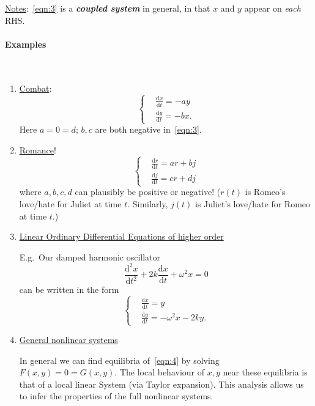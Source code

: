 \documentclass[12pt]{report}
\theoremstyle{definition}
\begin{document}
\noindent \underline{Notes}:~\eqref{eqn:3} is a \textbf{\emph{coupled system}} in general,
in that $x$ and $y$ appear on \emph{each} RHS.\@

\paragraph{Examples}
\,

\begin{enumerate}[label = (\alph*)]
    \item \underline{Combat}:\[
        \left\{\begin{align*}
            & \frac{\mathrm{d}x}{\mathrm{d}t} = -ay \\
            & \frac{\mathrm{d}y}{\mathrm{d}t} = -bx.
        \end{align*}\right.
    \]
    Here $a = 0 = d$; $b, c$ are both negative in~\eqref{eqn:3}.

\item \underline{Romance}!\[
    \left\{
        \begin{align*}
            & \frac{\mathrm{d}r}{\mathrm{d}t} = ar + bj \\
            & \frac{\mathrm{d}j}{\mathrm{d}t} = cr + dj
        \end{align*}
        \right.
\]
where $a,b,c,d$ can plausibly be positive or negative!
($r(t)$ is Romeo's love/hate for Juliet at time $t$.
Similarly, $j(t)$ is Juliet's love/hate for Romeo at time $t$.)

\item \underline{Linear Ordinary Differential Equations of higher order}

    E.g.\ Our damped harmonic oscillator\[
        \frac{\mathrm{d}^{2}x}{\mathrm{d}t^{2}} + 2k\frac{\mathrm{d}x}{\mathrm{d}t}
        + \omega^{2}x = 0
    \]can be written in the form
    \begin{equation}\label{eqn:7}
        \left\{
            \begin{align*}
                & \frac{\mathrm{d}x}{\mathrm{d}t} = y \\
                & \frac{\mathrm{d}y}{\mathrm{d}t} = -\omega^{2}x - 2ky.
            \end{align*}
            \right.
    \end{equation}

\item \underline{General nonlinear systems}

    In general we can find equilibria of~\eqref{eqn:4} by solving
    $F(x,y) = 0 = G(x,y)$. The local behaviour of $x,y$ near these equilibria
    is that of a local linear System (via Taylor expansion).
    This analysis allows us to infer the properties of the full nonlinear systems.
\end{enumerate}
\end{document}
